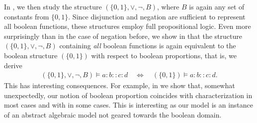 \documentclass[11pt]{amsart}
\theoremstyle{definition} %
\begin{document}
In , we then study the structure $(\{0,1\},\lor,\neg,B)$, where $B$ is again any set of constants from $\{0,1\}$. Since disjunction and negation are sufficient to represent all boolean functions, these structures employ full propositional logic. Even more surprisingly than in the case of negation before, we show in  that the structure $(\{0,1\},\lor,\neg,B)$ containing \textit{all} boolean functions is again equivalent to the boolean structure $(\{0,1\})$ with respect to boolean proportions, that is, we derive
\begin{align*} 
	(\{0,1\},\lor,\neg,B)\models a:b::c:d \quad\Leftrightarrow\quad (\{0,1\})\models a:b::c:d.
\end{align*} This has interesting consequences. For example, in  we show that, somewhat unexpectedly, our notion of boolean proportion coincides with  characterization in most cases and with  in some cases. This is interesting as our model is an instance of an abstract algebraic model not geared towards the boolean domain.
\end{document}
